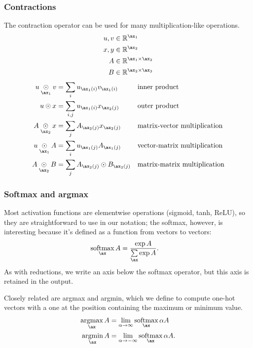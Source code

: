 \documentclass{article}
\begin{document}
\subsubsection{Contractions}
\label{sec:contractions}

The contraction operator can be used for many multiplication-like operations.
\begin{align*}
  u, v &\in \mathbb{R}^{\ax_1} \\
  x, y &\in \mathbb{R}^{\ax_2} \\
  A &\in \mathbb{R}^{\ax_1 \times \ax_2} \\
  B &\in \mathbb{R}^{\ax_2 \times \ax_3}
\end{align*}
\begin{align*}
  u \ndot{\ax_1} v &= \sum_i u_{\ax_1(i)} v_{\ax_1(i)} && \text{inner product} \\
  u \odot x &= \sum_{i,j} u_{\ax_1(i)} x_{\ax_2(j)} && \text{outer product} \\
  A \ndot{\ax_2} x &= \sum_j A_{\ax_2(j)} x_{\ax_2(j)} && \text{matrix-vector multiplication} \\
  u \ndot{\ax_1} A &= \sum_i u_{\ax_1(j)} A_{\ax_1(j)} && \text{vector-matrix multiplication} \\
  A \ndot{\ax_2} B &= \sum_j A_{\ax_2(j)} \odot B_{\ax_2(j)} && \text{matrix-matrix multiplication}
\end{align*}

\subsubsection{Softmax and argmax}

Most activation functions are elementwise operations (sigmoid, tanh, ReLU), so they are straightforward to use in our notation; the softmax, however, is interesting because it's defined as a function from vectors to vectors:
\begin{align*}
  \nfun{\ax}{softmax} A &= \frac{\exp A}{\nsum{\ax} \exp A}.
\end{align*}
As with reductions, we write an axis below the softmax operator, but this axis is retained in the output.

Closely related are argmax and argmin, which we define to compute one-hot vectors with a one at the position containing the maximum or minimum value.
\begin{align*}
  \nfun{\ax}{argmax} A &= \lim_{\alpha \rightarrow \infty} \nfun{\ax}{softmax} \alpha A \\
  \nfun{\ax}{argmin} A &= \lim_{\alpha \rightarrow -\infty} \nfun{\ax}{softmax} \alpha A.
\end{align*}
\end{document}
